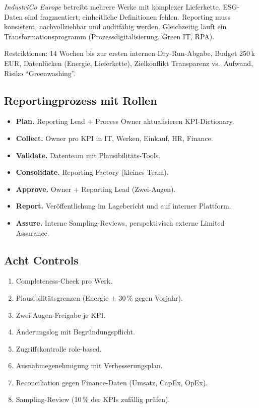 \documentclass[11pt,a4paper,oneside]{article}
\begin{document}
\emph{IndustriCo Europe} betreibt mehrere Werke mit komplexer Lieferkette. ESG-Daten sind fragmentiert; einheitliche Definitionen fehlen. Reporting muss konsistent, nachvollziehbar und auditfähig werden. Gleichzeitig läuft ein Transformationsprogramm (Prozessdigitalisierung, Green IT, RPA).

Restriktionen: 14 Wochen bis zur ersten internen Dry-Run-Abgabe, Budget 250\,k EUR, Datenlücken (Energie, Lieferkette), Zielkonflikt Transparenz vs.\ Aufwand, Risiko ``Greenwashing''.

\subsection{Reportingprozess mit Rollen}

\begin{itemize}
  \item \textbf{Plan.} Reporting Lead + Process Owner aktualisieren KPI-Dictionary.
  \item \textbf{Collect.} Owner pro KPI in IT, Werken, Einkauf, HR, Finance.
  \item \textbf{Validate.} Datenteam mit Plausibilitäts-Tools.
  \item \textbf{Consolidate.} Reporting Factory (kleines Team).
  \item \textbf{Approve.} Owner + Reporting Lead (Zwei-Augen).
  \item \textbf{Report.} Veröffentlichung im Lagebericht und auf interner Plattform.
  \item \textbf{Assure.} Interne Sampling-Reviews, perspektivisch externe Limited Assurance.
\end{itemize}

\subsection{Acht Controls}

\begin{enumerate}
  \item Completeness-Check pro Werk.
  \item Plausibilitätsgrenzen (Energie $\pm$ 30\,\% gegen Vorjahr).
  \item Zwei-Augen-Freigabe je KPI.
  \item Änderungslog mit Begründungspflicht.
  \item Zugriffskontrolle role-based.
  \item Ausnahmegenehmigung mit Verbesserungsplan.
  \item Reconciliation gegen Finance-Daten (Umsatz, CapEx, OpEx).
  \item Sampling-Review (10\,\% der KPIs zufällig prüfen).
\end{enumerate}
\end{document}
